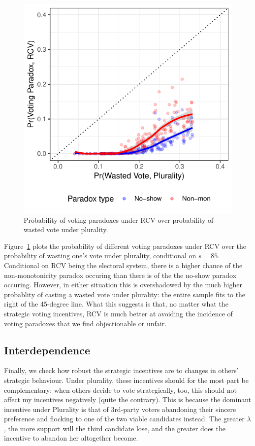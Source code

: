 \documentclass[11pt, letter]{article}
\begin{document}
\begin{figure}[!htb]
	\centering
	\includegraphics[width = .6 \textwidth]{"../output/figures/paradoxes_cses"}
	\caption{Probability of voting paradoxes under RCV over probability of wasted vote under plurality.}
	\label{fig:paradox}
\end{figure}

Figure~\ref{fig:paradox} plots the probability of different voting paradoxes under RCV over the probability of wasting one's vote under plurality, conditional on $s = 85$. Conditional on RCV being the electoral system, there is a higher chance of the non-monotonicity paradox occuring than there is of the the no-show paradox occuring. However, in either situation this is overshadowed by the much higher probablity of casting a wasted vote under plurality: the entire sample fits to the right of the 45-degree line. What this suggests is that, no matter what the strategic voting incentives, RCV is much better at avoiding the incidence of voting paradoxes that we find objectionable or unfair.


\subsection{Interdependence} \label{interdep}

Finally, we check how robust the strategic incentives are to changes in others' strategic behaviour. Under plurality, these incentives should for the most part be complementary: when others decide to vote strategically, too, this should not affect my incentives negatively (quite the contrary). This is because the dominant incentive under Plurality is that of 3rd-party voters abandoning their sincere preference and flocking to one of the two viable candidates instead. The greater $\lambda$, the more support will the third candidate lose, and the greater does the incentive to abandon her altogether become.
\end{document}
